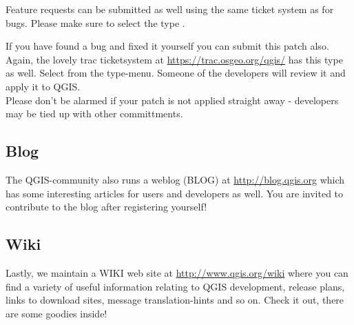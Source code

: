 Feature requests can be submitted as well using the same ticket system as for bugs.
Please make sure to select the type .

If you have found a bug and fixed it yourself you can submit this patch also.
Again, the lovely trac ticketsystem at \url{https://trac.osgeo.org/qgis/} has this 
type as well. Select  from the type-menu. Someone of the 
developers will review it and apply it to QGIS. \\
Please don't be alarmed if your patch is not applied straight away - developers
may be tied up with other committments.


\subsection{Blog}
The QGIS-community also runs a weblog (BLOG) at \url{http://blog.qgis.org} 
which has some interesting articles for users and developers as well. 
You are invited to contribute to the blog after registering yourself!

\subsection{Wiki}
Lastly, we maintain a WIKI web site at \url{http://www.qgis.org/wiki} where you 
can find a variety of useful information relating to QGIS development, 
release plans, links to download sites, message translation-hints and so on. 
Check it out, there are some goodies inside!

